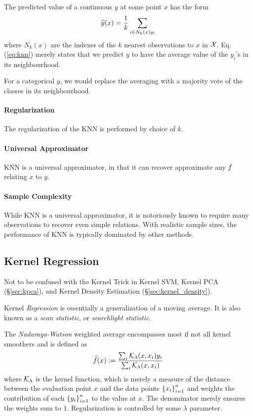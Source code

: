 The predicted value of a continuous $y$ at some point $x$ has the form
\begin{align}
\label{eq:knn}
	\widehat{y}(x)=\frac{1}{k}\sum_{i \in N_k(x) y_i}
\end{align}
where $N_k(x)$ are the indexes of the $k$ nearest observations to $x$ in $\mathcal{X}$.
Eq.(\ref{eq:knn}) merely states that we predict $y$ to have the average value of the $y_i$'s in its neighbourhood.

For a categorical $y$, we would replace the averaging with a majority vote of the classes in its neighbourhood.

\paragraph{Regularization}
The regularization of the KNN is performed by choice of $k$.

\paragraph{Universal Approximator}
KNN is a universal approximator, in that it can recover approximate any $f$ relating $x$ to $y$.

\paragraph{Sample Complexity}
While KNN is a universal approximator, it is notoriously known to require many observations to recover even simple relations. With realistic sample sizes, the performance of KNN is typically dominated by other methods.




\subsection{Kernel Regression}
\label{sec:kernel}

Not to be confused with the Kernel Trick in Kernel SVM, Kernel PCA (\S\ref{sec:kpca}), and Kernel Density Estimation (\S\ref{sec:kernel_density}).

Kernel \emph{Regression} is essentially a generalization of a moving average.
It is also known as a \emph{scan statistic}, or \emph{searchlight statistic}.

The \emph{Nadaraya-Watson} weighted average encompasses most if not all kernel smoothers and is defined as 
\begin{align}
\label{eq:nadaraya_watson}
	\widehat{f}(x):= \frac{\sum_i \mathcal{K}_\lambda(x,x_i)y_i}{\sum_i \mathcal{K}_\lambda(x,x_i)}
\end{align}
where $\mathcal{K}_\lambda$ is the kernel function, which is merely a measure of the distance between the evaluation point $x$ and the data points $\left\{  x_i  \right\}_{i=1}^n$ and weights the contribution of each $\left\{  y_i  \right\}_{i=1}^n$ to the value at $x$.
The denominator merely ensures the weights sum to $1$.
Regularization is controlled by some $\lambda$ parameter.

